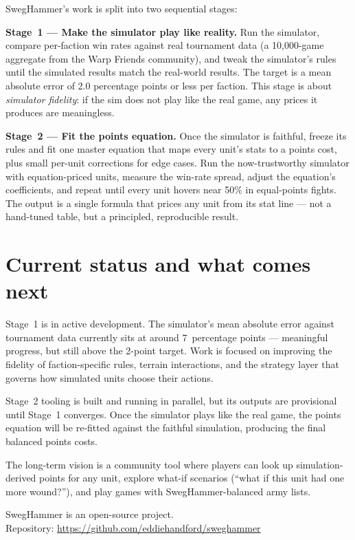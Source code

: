 \documentclass[11pt,a4paper]{article}
\begin{document}
SwegHammer's work is split into two sequential stages:

\textbf{Stage~1 --- Make the simulator play like reality.} Run the
simulator, compare per-faction win rates against real tournament data (a
10,000-game aggregate from the Warp Friends community), and tweak the
simulator's rules until the simulated results match the real-world results.
The target is a mean absolute error of 2.0 percentage points or less per
faction. This stage is about \textit{simulator fidelity}: if the sim does
not play like the real game, any prices it produces are meaningless.

\textbf{Stage~2 --- Fit the points equation.} Once the simulator is
faithful, freeze its rules and fit one master equation that maps every
unit's stats to a points cost, plus small per-unit corrections for edge
cases. Run the now-trustworthy simulator with equation-priced units, measure
the win-rate spread, adjust the equation's coefficients, and repeat until
every unit hovers near 50\% in equal-points fights. The output is a single
formula that prices any unit from its stat line --- not a hand-tuned table,
but a principled, reproducible result.

\section{Current status and what comes next}

Stage~1 is in active development. The simulator's mean absolute error
against tournament data currently sits at around 7~percentage points ---
meaningful progress, but still above the 2-point target. Work is focused on
improving the fidelity of faction-specific rules, terrain interactions, and
the strategy layer that governs how simulated units choose their actions.

Stage~2 tooling is built and running in parallel, but its outputs are
provisional until Stage~1 converges. Once the simulator plays like the real
game, the points equation will be re-fitted against the faithful simulation,
producing the final balanced points costs.

The long-term vision is a community tool where players can look up
simulation-derived points for any unit, explore what-if scenarios (``what if
this unit had one more wound?''), and play games with SwegHammer-balanced
army lists.

\vfill

\begin{center}
  \small\color{greytext}
  SwegHammer is an open-source project.\\
  Repository: \url{https://github.com/eddiehandford/sweghammer}
\end{center}
\end{document}
